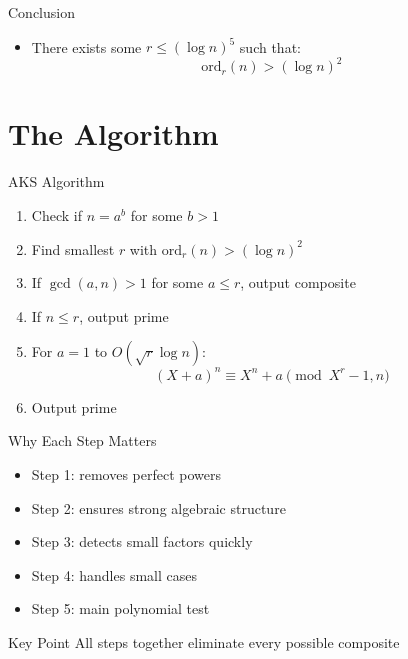 \documentclass{beamer}
\begin{document}

\begin{frame}{Conclusion}

\begin{itemize}
    \item There exists some $r \le (\log n)^5$ such that:
\[
\mathrm{ord}_r(n) > (\log n)^2
\]
\end{itemize}

\end{frame}



\section{The Algorithm}

\begin{frame}{AKS Algorithm}

\begin{enumerate}
    \item Check if $n = a^b$ for some $b > 1$
    \item Find smallest $r$ with $\mathrm{ord}_r(n) > (\log n)^2$
    \item If $\gcd(a,n) > 1$ for some $a \le r$, output composite
    \item If $n \le r$, output prime
    \item For $a = 1$ to $O(\sqrt{r}\log n)$:
    \[
    (X+a)^n \equiv X^n + a \pmod{X^r -1, n}
    \]
    \item Output prime
\end{enumerate}

\end{frame}


\begin{frame}{Why Each Step Matters}

\begin{itemize}
    \item Step 1: removes perfect powers
    \item Step 2: ensures strong algebraic structure
    \item Step 3: detects small factors quickly
    \item Step 4: handles small cases
    \item Step 5: main polynomial test
\end{itemize}


\begin{block}{Key Point}
All steps together eliminate every possible composite
\end{block}

\end{frame}
\end{document}

